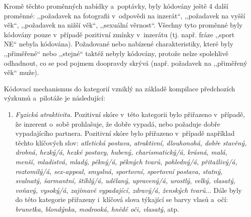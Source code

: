 \documentclass[a4paper, 12pt, notitlepage, oneside, numbers=noenddot]{report}
\begin{document}
Kromě těchto proměnných nabídky a~poptávky, byly kódovány ještě 4
další proměnné: ,,požadavek na fotografii v~odpovědi na inzerát``,
,,požadavek na vyšší věk``, ,,požadavek na nižší věk``, ,,sexuální
věrnost``. Všechny tyto proměnné byly kódovány pouze v~případě
pozitivní zmínky v~inzerátu (tj. např. fráze ,,sport NE`` nebyla
kódována). Požadované nebo nabízené charakteristiky, které byly
,,přiměřené`` nebo ,,stejné`` taktéž nebyly kó\-do\-vá\-ny, protože
nelze spolehlivě odhadnout, co se pod pojmem doopravdy skrývá
(např. požadavek na ,,přiměřený věk`` muže).

Kódovací mechanismus do kategorií vzniklý na základě kompilace předchozích výzkumů
a~pilotáže je následující:

\begin{enumerate}
\item \emph{Fyzická atraktivita.} Pozitivní skóre v~této kategorii
  bylo přiřazeno v~případě, že inzerent o~sobě prohlašuje, že dobře
  vypadá, nebo požaduje dobře vypadajícího partnera. Pozitivní skóre
  bylo přiřazeno v~případě například těchto klíčových slov:
  \emph{atletická postava, atraktivní, dlouhonohá, dobře stavěný,
    drobná, hezký/á, hezké postavy, hubený, charismatický/á, krásná,
    malá, menší, mladistvá, mladý, pěkný/á, pěkných tvarů, pohledný/á,
    přitažlivý/á, roztomilý/á, sex-appeal, smyslná, sportovní,
    sportovní postava, statný, svalnatý, šarmantní, štíhlý/á, udělaný,
    upravený/á, u\-rost\-lý, velký, vlasatý, voňavý, vysoký/á, zajímavě
    vypadající, zdravý/á, ženských tvarů}...  Dále byly do této
  kategorie přiřazeny i~klíčová slova týkající se barvy vlasů a~očí:
  \emph{brunetka, blondýnka, modrooká, hnědé oči, vlasatý}, atp.


\end{enumerate}
\end{document}
